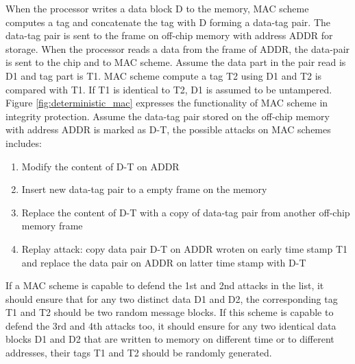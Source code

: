 \documentclass{article}
\begin{document}
When the processor writes a data block D to the memory, MAC scheme computes a tag  and concatenate the tag with D forming a data-tag pair. The data-tag pair is sent to the frame on off-chip memory with address ADDR for storage.
When the processor reads a data from the frame of ADDR, the data-pair is sent to the chip and to MAC scheme. Assume the data part in the pair read is D1 and tag part is T1. MAC scheme compute a tag T2 using D1 and T2 is compared with T1. If T1 is identical to T2, D1 is assumed to be untampered.
 Figure \ref{fig:deterministic_mac} expresses the functionality of MAC scheme in integrity protection.
Assume the data-tag pair stored on the off-chip memory with address ADDR is marked as D-T, the possible attacks on MAC schemes includes:
\begin{enumerate}
	\item Modify the content of D-T on ADDR 
	\item Insert new data-tag pair to a empty frame on the memory
	\item Replace the content of D-T with a copy of data-tag pair from another off-chip memory frame 
	\item Replay attack: copy data pair D-T on ADDR wroten on early time stamp T1 and replace the data pair on ADDR on latter time stamp with D-T 
\end{enumerate}
If a MAC scheme is capable to defend the 1st and 2nd attacks in the list, it should ensure that for any two distinct data D1 and D2, the corresponding tag T1 and T2 should be two random message blocks. If this scheme is capable to defend the 3rd and 4th attacks too, it should ensure for any two identical data blocks D1 and D2 that are written to memory on different time or to different addresses, their tags T1 and T2 should be randomly generated.
\end{document}
